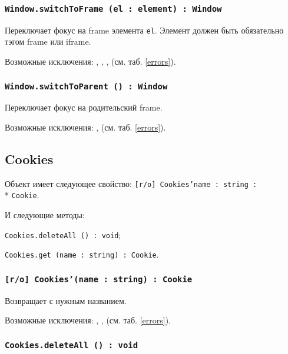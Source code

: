 \subsubsection{\texttt{Window.switchToFrame (el : element) : Window}}

Переключает фокус на frame элемента \texttt{el}. Элемент должен быть обязательно тэгом frame или iframe.

Возможные исключения: , , ,  (см. таб. \ref{errors}).

\subsubsection{\texttt{Window.switchToParent () : Window}}

Переключает фокус на родительский frame.

Возможные исключения: ,  (см. таб. \ref{errors}).

\subsection{{\color{orange} Cookies}}

Объект \cookies{} имеет следующее свойство: \texttt{[r/o] Cookies'name : string :}\\* \texttt{Cookie}.

И следующие методы: 
\begin{icItems}
	\item \texttt{Cookies.deleteAll () : void};
	\item \texttt{Cookies.get (name : string) : Cookie}.
\end{icItems}

\subsubsection{\texttt{[r/o] Cookies'(name : string) : Cookie}}

Возвращает \cookie{} с нужным названием.

Возможные исключения: , ,  (см. таб. \ref{errors}).

\subsubsection{\texttt{Cookies.deleteAll () : void}}

